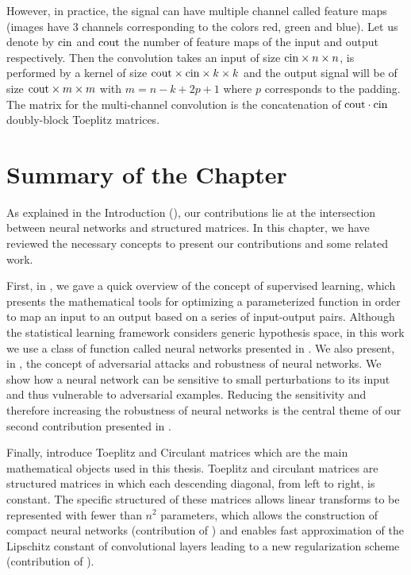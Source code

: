 However, in practice, the signal can have multiple channel called feature maps (\eg images have 3 channels corresponding to the colors red, green and blue).
Let us denote by $\mathrm{cin}$ and $\mathrm{cout}$ the number of feature maps of the input and output respectively.
Then the convolution %
takes an input of size $\mathrm{cin} \times n \times n$, is performed by a kernel of size $\mathrm{cout} \times \mathrm{cin} \times k \times k$ and the output signal will be of size $\mathrm{cout} \times m \times m$ with $m = n - k + 2p + 1$ where $p$ corresponds to the padding.
The matrix for the multi-channel convolution is the concatenation of $\mathrm{cout} \cdot \mathrm{cin}$ doubly-block Toeplitz matrices.



\section{Summary of the Chapter}
\label{section:ch2-summary_of_the_background}

As explained in the Introduction (), our contributions lie at the intersection between neural networks and structured matrices.
In this chapter, we have reviewed the necessary concepts to present our contributions and some related work.

First, in , we gave a quick overview of the concept of supervised learning, which presents the mathematical tools for optimizing a parameterized function in order to map an input to an output based on a series of input-output pairs. 
Although the statistical learning framework considers generic hypothesis space, in this work we use a class of function called neural networks presented in .
We also present, in , the concept of adversarial attacks and robustness of neural networks.
We show how a neural network can be sensitive to small perturbations to its input and thus vulnerable to adversarial examples.
Reducing the sensitivity and therefore increasing the robustness of neural networks is the central theme of our second contribution presented in .

Finally,  introduce Toeplitz and Circulant matrices which are the main mathematical objects used in this thesis.
Toeplitz and circulant matrices are structured matrices in which each descending diagonal, from left to right, is constant.
The specific structured of these matrices allows linear transforms to be represented with fewer than $n^2$ parameters, which allows the construction of compact neural networks (contribution of ) and enables fast approximation of the Lipschitz constant of convolutional layers leading to a new regularization scheme (contribution of ).









